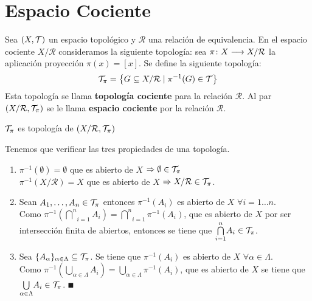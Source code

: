 \documentclass[GTS.tex]{subfiles}
\begin{document}
\section{Espacio Cociente}
Sea $(X,\mathcal{T})$ un espacio topológico y $\mathcal{R}$ una relación de equivalencia. En el espacio cociente $X/\mathcal{R}$ consideramos la siguiente topología: sea $\pi\colon{X}\longrightarrow{X/\mathcal{R}}$ la aplicación proyección $\pi(x)=[x]$. Se define la siguiente topología:
\begin{equation*}
\mathcal{T}_\pi=\left\{G\subseteq X/\mathcal{R}\mid \pi^{-1}(G)\in\mathcal{T}\right\}
\end{equation*}
Esta topología se llama \textbf{topología cociente} para la relación $\mathcal{R}$. Al par $\left(X/\mathcal{R},\mathcal{T}_\pi\right)$ se le llama \textbf{espacio cociente} por la relación $\mathcal{R}$.
\begin{lemma}$\mathcal{T}_\pi$ es topología de $\left(X/\mathcal{R},\mathcal{T}_\pi\right)$
\end{lemma}
\begin{dem}
Tenemos que verificar las tres propiedades de una topología.
\begin{enumerate}
\item $\pi^{-1}(\emptyset)=\emptyset$ que es abierto de $X$ $\Rightarrow \emptyset\in\mathcal{T}_\pi$\\ $\pi^{-1}(X/\mathcal{R})=X$ que es abierto de $X$ $\Rightarrow X/\mathcal{R}\in\mathcal{T}_\pi$.
\item Sean $A_1,\dots,A_n\in\mathcal{T}_\pi$ entonces $\pi^{-1}(A_i)$ es abierto de $X$ $\forall i=1\dots n$.\\ Como $\pi^{-1}\left(\underset{i=1}{\overset{n}{\bigcap}}A_i\right)=\underset{i=1}{\overset{n}{\bigcap}}\pi^{-1}(A_i)$, que es abierto de $X$ por ser intersección finita de abiertos, entonces se tiene que $\underset{i=1}{\overset{n}{\bigcap}}A_i\in\mathcal{T}_\pi$.
\item Sea $\{A_\alpha\}_{\alpha\in\Lambda}\subseteq\mathcal{T}_\pi$. Se tiene que $\pi^{-1}(A_i)$ es abierto de $X$ $\forall\alpha\in\Lambda$.\\ Como $\pi^{-1}\left(\underset{\alpha\in\Lambda}{\bigcup}A_i\right)=\underset{\alpha\in\Lambda}{\bigcup}\pi^{-1}(A_i)$, que es abierto de $X$ se tiene que ${\underset{\alpha\in\Lambda}{\bigcup}}A_i\in\mathcal{T}_\pi$. $\QED$
\end{enumerate}
\end{dem}

\vspace{1cm}
\end{document}
